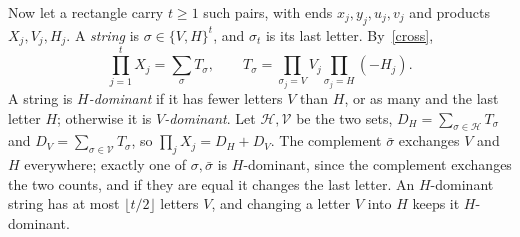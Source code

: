 \documentclass[10pt]{article}
\newcommand{\Hs}{\mathcal H}
\newcommand{\Vs}{\mathcal V}
\begin{document}
Now let a rectangle carry $t\ge1$ such pairs, with ends $x_j,y_j,u_j,v_j$ and products $X_j,V_j,H_j$. A \emph{string} is $\sigma\in\{V,H\}^t$, and $\sigma_t$ is its last letter. By~\eqref{cross},
\[
\prod_{j=1}^tX_j=\sum_\sigma T_\sigma,\qquad T_\sigma=\prod_{\sigma_j=V}V_j\prod_{\sigma_j=H}(-H_j).
\]
A string is \emph{$H$-dominant} if it has fewer letters $V$ than $H$, or as many and the last letter $H$; otherwise it is \emph{$V$-dominant}. Let $\Hs,\Vs$ be the two sets, $D_H=\sum_{\sigma\in\Hs}T_\sigma$ and $D_V=\sum_{\sigma\in\Vs}T_\sigma$, so $\prod_jX_j=D_H+D_V$. The complement $\bar\sigma$ exchanges $V$ and $H$ everywhere; exactly one of $\sigma,\bar\sigma$ is $H$-dominant, since the complement exchanges the two counts, and if they are equal it changes the last letter. An $H$-dominant string has at most $\lfloor t/2\rfloor$ letters $V$, and changing a letter $V$ into $H$ keeps it $H$-dominant.
\end{document}
